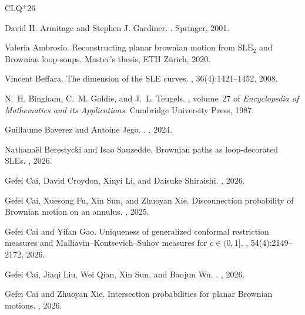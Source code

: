 \documentclass[11pt]{article}
\numberwithin{equation}{section}
\newcommand{\1}{\mathbf{1}}
\begin{document}
\footnotesize{
\newcommand{\etalchar}[1]{$^{#1}$}
\def\cprime{$'$}
\begin{thebibliography}{CLQ{\etalchar{+}}26}

David H. Armitage and Stephen J. Gardiner.
.
\newblock Springer, 2001.

Valeria Ambrosio.
\newblock Reconstructing planar brownian motion from {$\mathrm{SLE}_2$} and
  {B}rownian loop-soups.
\newblock Master's thesis, ETH Z{\"u}rich, 2020.

Vincent Beffara.
\newblock The dimension of the {SLE} curves.
, 36(4):1421--1452, 2008.

N.~H. Bingham, C.~M. Goldie, and J.~L. Teugels.
, volume~27 of {\em Encyclopedia of
  Mathematics and its Applications}.
\newblock Cambridge University Press, 1987.

Guillaume Baverez and Antoine Jego.
.
, 2024.

Nathana{\"e}l Berestycki and Isao Sauzedde.
\newblock Brownian paths as loop-decorated {SLE}s.
, 2026.

Gefei Cai, David Croydon, Xinyi Li, and Daisuke Shiraishi.
, 2026.

Gefei Cai, Xuesong Fu, Xin Sun, and Zhuoyan Xie.
\newblock Disconnection probability of Brownian motion on an annulus.
, 2025.

Gefei Cai and Yifan Gao.
\newblock Uniqueness of generalized conformal restriction measures and
  {Malliavin--Kontsevich--Suhov} measures for $c \in (0,1]$.
, 54(4):2149--2172, 2026.

\bibitem[CLQ{\etalchar{+}}26]{touching}
Gefei Cai, Jiaqi Liu, Wei Qian, Xin Sun, and Baojun Wu.
.
, 2026.

Gefei Cai and Zhuoyan Xie.
\newblock Intersection probabilities for planar {B}rownian motions.
, 2026.


\end{thebibliography}}
\end{document}
